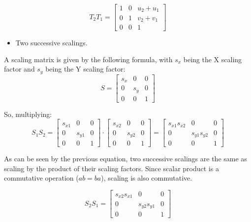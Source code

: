 \documentclass[12pt]{article}
\begin{document}
\begin{equation*}
    T_2T_1=
    \begin{bmatrix}
    1 & 0 & u_2 + u_1 \\
    0 & 1 & v_2 + v_1 \\
    0 & 0 & 1
    \end{bmatrix}
\end{equation*}

\begin{itemize}
    \item Two successive scalings.
\end{itemize}

A scaling matrix is given by the following formula, with $s_x$ being the X scaling factor and $s_y$ being the Y scaling factor:
\begin{equation*}
    S = 
    \begin{bmatrix}
    s_x & 0 & 0 \\
    0 & s_y & 0 \\
    0 & 0 & 1
    \end{bmatrix}
\end{equation*}

So, multiplying:
\begin{equation*}
    S_1S_2 = 
    \begin{bmatrix}
    s_{x1} & 0 & 0 \\
    0 & s_{y1} & 0 \\
    0 & 0 & 1
    \end{bmatrix}
    \cdot
    \begin{bmatrix}
    s_{x2} & 0 & 0 \\
    0 & s_{y2} & 0 \\
    0 & 0 & 1
    \end{bmatrix}
    =
    \begin{bmatrix}
    s_{x1}s_{x2} & 0 & 0 \\
    0 & s_{y1}s_{y2} & 0 \\
    0 & 0 & 1
    \end{bmatrix}
\end{equation*}

As can be seen by the previous equation, two successive scalings are the same as scaling by the product of their scaling factors. Since scalar product is a commutative operation ($ab = ba$), scaling is also commutative.

\begin{equation*}
    S_2S_1=
    \begin{bmatrix}
    s_{x2}s_{x1} & 0 & 0 \\
    0 & s_{y2}s_{y1} & 0 \\
    0 & 0 & 1
    \end{bmatrix}
\end{equation*}
\end{document}
